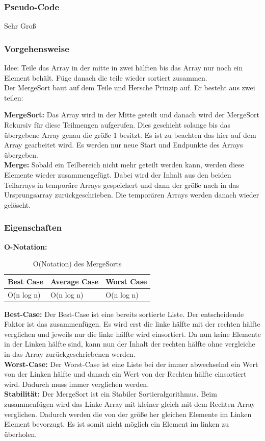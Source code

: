 \documentclass{article}
\begin{document}
\subsubsection{Pseudo-Code}
Sehr Groß
\subsubsection{Vorgehensweise}
Idee: Teile das Array in der mitte in zwei hälften bis das Array nur noch ein Element behält. Füge danach die teile wieder sortiert zusammen. \\

Der MergeSort baut auf dem Teile und Hersche Prinzip auf. Er besteht aus zwei teilen:

\textbf{MergeSort:} Das Array wird in der Mitte geteilt und danach wird der MergeSort Rekursiv für diese Teilmengen aufgerufen. Dies geschieht solange bis das übergebene Array genau die größe 1 besitzt. Es ist zu beachten das hier auf dem Array gearbeitet wird. Es werden nur neue Start und Endpunkte des Arrays übergeben. \\
\textbf{Merge: } Sobald ein Teilbereich nicht mehr geteilt werden kann, werden diese Elemente wieder zusammengefügt. Dabei wird der Inhalt aus den beiden Teilarrays in temporäre Arrays gespeichert und dann der größe nach in das Ursprungsarray zurückgeschrieben. Die temporären Arrays werden danach wieder gelöscht. 


\subsubsection{Eigenschaften}
\textbf{O-Notation:}
\begin{table}[h]
\centering
\begin{tabular}{lll}
	\hline
	\textbf{Best Case} & \textbf{Average Case} & \textbf{Worst Case} \\
	\hline
	O(n log n) & O(n log n) & O(n log n) \\
	\hline
\end{tabular}
\caption{O(Notation) des MergeSorts \cite{ONotationen}}
\label{tab:MergeSort}
\end{table}

\textbf{Best-Case:} Der Best-Case ist eine bereits sortierte Liste. Der entscheidende Faktor ist das zusammenfügen. Es wird erst die linke hälfte mit der rechten hälfte verglichen und jeweils nur die linke hälfte wird einsortiert. Da nun keine Elemente in der Linken hälfte sind, kann nun der Inhalt der rechten hälfte ohne vergleiche in das Array zurückgeschriebenen werden.\\
\textbf{Worst-Case:} Der Worst-Case ist eine Liste bei der immer abwechselnd ein Wert von der Linken hälfte und danach ein Wert von der Rechten hälfte einsortiert wird. Dadurch muss immer verglichen werden.\\
\textbf{Stabilität:}  Der MergeSort ist ein Stabiler Sortieralgorithmus. Beim zusammenfügen wird das Linke Array mit kleiner gleich  mit dem Rechten Array verglichen. Dadurch werden die von der größe her gleichen Elemente im Linken Element bevorzugt. Es ist somit nicht möglich ein Element im linken zu überholen.\\
\end{document}
